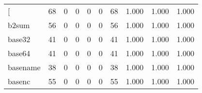 \begin{longtable}{lp{2.0cm}p{2.0cm}p{2.0cm}p{2.0cm}p{2.0cm}p{2.0cm}p{2.0cm}p{2.0cm}p{2.0cm}}
\bottomrule
\endlastfoot
{[}         &                     68 &                                             0 &                                            0 &                                           0 &                                            0 &                                         68 &                                1.000 &                                  1.000 &                                1.000 \\
b2sum     &                     56 &                                             0 &                                            0 &                                           0 &                                            0 &                                         56 &                                1.000 &                                  1.000 &                                1.000 \\
base32    &                     41 &                                             0 &                                            0 &                                           0 &                                            0 &                                         41 &                                1.000 &                                  1.000 &                                1.000 \\
base64    &                     41 &                                             0 &                                            0 &                                           0 &                                            0 &                                         41 &                                1.000 &                                  1.000 &                                1.000 \\
basename  &                     38 &                                             0 &                                            0 &                                           0 &                                            0 &                                         38 &                                1.000 &                                  1.000 &                                1.000 \\
basenc    &                     55 &                                             0 &                                            0 &                                           0 &                                            0 &                                         55 &                                1.000 &                                  1.000 &                                1.000 \\

\end{longtable}
